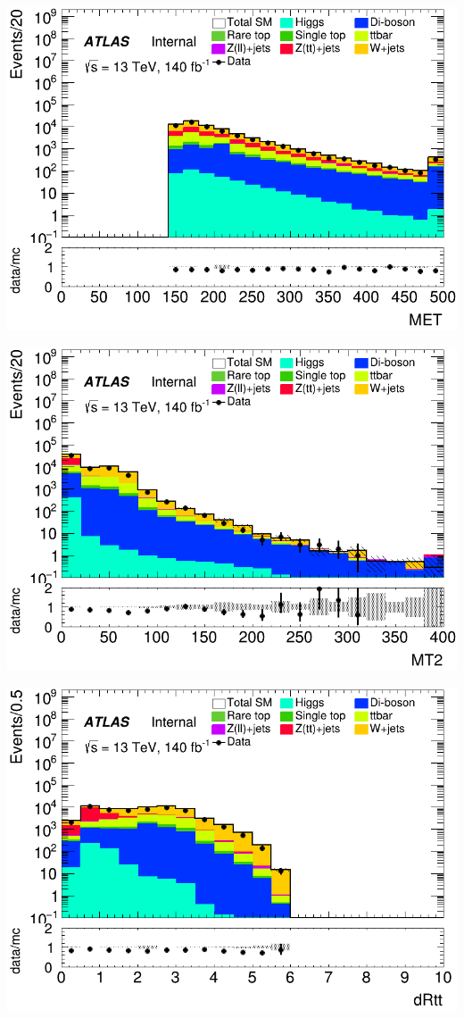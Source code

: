 \documentclass[usenames,dvipsnames]{beamer}
\begin{document}
\begin{frame}
    \begin{minipage}{0.32\textwidth}
        \centering
        \includegraphics[width=\textwidth]{graphics/LH_met/LH_met_MET.png}
    \end{minipage}
    \hfill
    \begin{minipage}{0.32\textwidth}
        \centering
        \includegraphics[width=\textwidth]{graphics/LH_met/LH_met_MT2.png}
    \end{minipage}
    \hfill
    \begin{minipage}{0.32\textwidth}
        \centering
        \includegraphics[width=\textwidth]{graphics/LH_met/LH_met_dRtt.png}

\end{minipage}
\end{frame}
\end{document}
